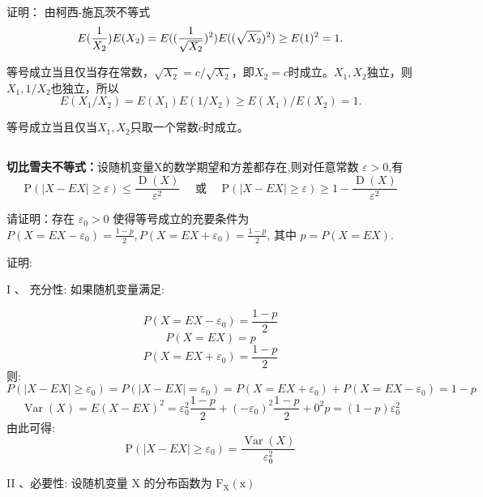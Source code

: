 \documentclass[UTF8,a4paper,10pt]{ctexart}
\begin{document}
证明：
由柯西-施瓦茨不等式
\begin{equation}
    E({1\over X_2}) E(X_2) = E(({1\over \sqrt{X_2}})^2) E((\sqrt{X_2})^2)\geq E(1)^2 = 1.
\end{equation}

等号成立当且仅当存在常数，$\sqrt{X_2} = c/\sqrt{X_2}$，即$X_2=c$时成立。$X_1,X_2$独立，则$X_1, 1/X_2$也独立，所以
\begin{equation}
    E(X_1/X_2) = E(X_1)E(1/X_2) \geq E(X_1)/E(X_2) = 1.
\end{equation}

等号成立当且仅当$X_1, X_2$只取一个常数$c$时成立。

\subsection{}
\textbf{切比雪夫不等式：}设随机变量X的数学期望和方差都存在,则对任意常数 $\varepsilon>0$,有
$$
\mathrm{P}(|X-E X| \geq \varepsilon) \leq \frac{\operatorname{D}(X)}{\varepsilon^{2}} \quad \text { 或 } \quad \mathrm{P}(|X-E X| \geq \varepsilon) \geq 1-\frac{\operatorname{D}(X)}{\varepsilon^{2}}
$$

请证明：存在 $\varepsilon_{0}>0$ 使得等号成立的充要条件为 $P\left(X=E X-\varepsilon_{0}\right)=\frac{1-p}{2}, P\left(X=E X+\varepsilon_{0}\right)=\frac{1-p}{2}$, 其中 $p=P(X=E X)$.

证明:


$\mathrm{I}$ 、 充分性: 如果随机变量满足:

\begin{flushleft}
$$P\left(X=E X-\varepsilon_{0}\right)=\frac{1-p}{2}$$
$$P(X=E X)=p$$
$$P\left(X=E X+\varepsilon_{0}\right)=\frac{1-p}{2}$$ 则:
$$
P\left(|X-E X| \geq \varepsilon_{0}\right)=P\left(|X-E X|=\varepsilon_{0}\right)=P\left(X=E X+\varepsilon_{0}\right)+P\left(X=E X-\varepsilon_{0}\right)=1-p
$$
$$\operatorname{Var}(X)=E(X-E X)^{2}=\varepsilon_{0}^{2} \frac{1-p}{2}+\left(-\varepsilon_{0}\right)^{2} \frac{1-p}{2}+0^{2} p=(1-p) \varepsilon_{0}^{2}$$
 由此可得:
$$
\mathrm{P}\left(|X-E X| \geq \varepsilon_{0}\right)=\frac{\operatorname{Var}(X)}{\varepsilon_{0}^{2}}
$$
\end{flushleft}
II 、必要性: 设随机变量 $\mathrm{X}$ 的分布函数为 $\mathrm{F}_{\mathrm{X}}(\mathrm{x})$
\end{document}
